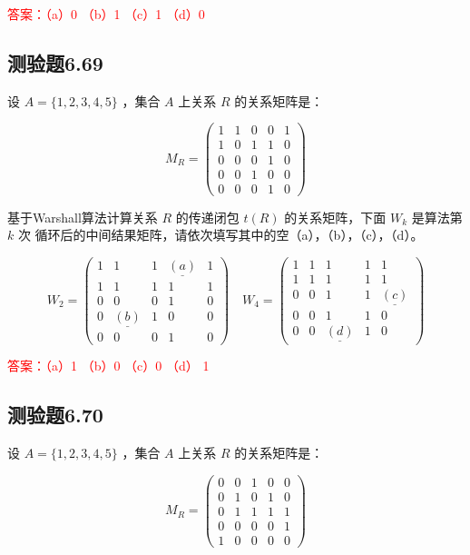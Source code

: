 \documentclass[UTF8, heading=true]{ctexart}
\begin{document}
\textcolor{red}{答案：（a）0 （b）1 （c）1 （d）0}


\subsection{测验题6.69}

设 $A=\{1,2,3,4,5\}$ ，集合 $A$ 上关系 $R$ 的关系矩阵是：

$$M_R=\left(\begin{array}{lllll}1 & 1 & 0 & 0 & 1 \\ 1 & 0 & 1 & 1 & 0 \\ 0 & 0 & 0 & 1 & 0 \\ 0 & 0 & 1 & 0 & 0 \\ 0 & 0 & 0 & 1 & 0\end{array}\right)$$

基于Warshall算法计算关系 $R$ 的传递闭包 $t(R)$ 的关系矩阵，下面 $W_k$ 是算法第 $k$ 次
循环后的中间结果矩阵，请依次填写其中的空（a），（b），（c），（d）。

$$W_2=\left(\begin{array}{ccccc}1 & 1 & 1 & \underline{(a)} & 1 \\ 1 & 1 & 1 & 1 & 1 \\ 0 & 0 & 0 & 1 & 0 \\ 0 & \underline{(b)} & 1 & 0 & 0 \\ 0 & 0 & 0 & 1 & 0\end{array}\right) \quad W_4=\left(\begin{array}{ccccc}1 & 1 & 1 & 1 & 1 \\ 1 & 1 & 1 & 1 & 1 \\ 0 & 0 & 1 & 1 & \underline{(c)} \\ 0 & 0 & 1 & 1 & 0 \\ 0 & 0 & \underline{(d)} & 1 & 0\end{array}\right)$$

\textcolor{red}{答案：（a）1 （b）0 （c）0 （d） 1}




\subsection{测验题6.70}

设 $A=\{1,2,3,4,5\}$ ，集合 $A$ 上关系 $R$ 的关系矩阵是：

$$
M_R=\left(\begin{array}{lllll}
0 & 0 & 1 & 0 & 0 \\
0 & 1 & 0 & 1 & 0 \\
0 & 1 & 1 & 1 & 1 \\
0 & 0 & 0 & 0 & 1 \\
1 & 0 & 0 & 0 & 0
\end{array}\right)
$$
\end{document}
